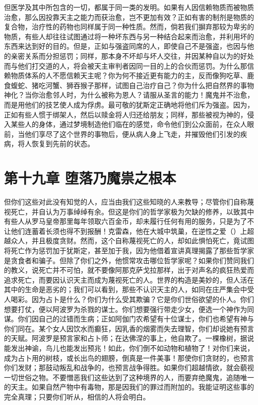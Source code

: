 但医学及其中所包含的一切，都属于同一类的发明。如果有人因信赖物质而被物质治愈，那么因投靠天主之能力而获治愈，岂不更加有效？正如有害的制剂是物质的复合物，治疗性的药物也同样属于同一种性质。然而，倘若我们摒弃那较为卑劣的物质，有些人却往往试图通过将一种坏东西与另一种结合起来而治愈，并利用坏的东西来达到好的目的。但是，正如与强盗同席的人，即使自己不是强盗，也因与他的亲密关系而分担惩罚；同样，那本身不坏却与坏人交往，并因某种自以为的好处而与他们打交道的人，将会被天主审判者因同一目的上的合伙而惩罚。为什么那信赖物质体系的人不愿信赖天主呢？你为何不接近更有能力的主，反而像狗吃草、鹿食蝮蛇、猪吃河蟹、狮吞猴子那样，试图自己治疗自己？你为什么把自然界的事物神化？当你治愈邻人时，为什么被称为恩人？请服从圣言的能力！魔鬼并不治愈，而是用他们的技艺使人成为俘虏。最可敬的犹斯定正确地将他们斥为强盗。因为，正如有些人惯于绑架人，然后以赎金将人归还给朋友；同样，那些被视为神的，侵入某些人的身体，通过梦境制造他们临在的感觉，命令他们到公众面前，在众人眼前，当他们享尽了这个世界的事物后，便从病人身上飞走，并摧毁他们引发的疾病，将人恢复到先前的状态。\par


\section{第十九章  堕落乃魔祟之根本}

但你们这些对此没有知觉的人，应当由我们这些知晓的人来教导；尽管你们自称蔑视死亡，并自认为万事绰绰有余。但这是你们的哲学家极为欠缺的修养，以致其中有些人从罗马皇帝那里每年领取六百金币，却未履行任何有用的服务，只是为了不让他们连蓄着长须也得不到报酬！克雷森，他在大城中筑巢，在逆性之爱（）上超越众人，并且极度贪财。然而，这个自称蔑视死亡的人，却如此惧怕死亡，竟试图将死亡作为惩罚加于犹斯定，甚至加于我，因为他借着宣讲真理揭露了那些哲学家是贪食者和骗子。但除了你们之外，他惯常攻击哪位哲学家呢？如果你们赞同我们的教义，说死亡并不可怕，就不要像阿那克萨戈拉那样，出于对声名的疯狂热爱而追求死亡，而要因认识天主而成为蔑视死亡的人。世界的构造是美妙的，但人活在其中的生命是恶劣的；我们可以看到，那些不认识天主的人，如同在庄严集会中受人喝彩。因为占卜是什么？你们为什么受其欺骗？它是你们世俗欲望的仆人。你们想要打仗，便以阿波罗为杀戮的谋士。你们想要强行带走少女，便选一个神作为同谋。你们因自己的过错而生病；正如阿伽门农希望有十位谋士，你们也希望有神与你们同在。某个女人因饮水而癫狂，因乳香的烟雾而失去理智，你们却说她有预言的天赋。阿波罗是预言家和占卜师；在达佛涅的事上，他自欺了。一棵橡树，据说能发出神谕，鸟儿也能发出预兆！如此，你们倒不如动物和植物了！对你们来说，成为占卜用的树枝，或长出鸟的翅膀，倒真是一件美事！那使你们贪财的，也预言你们发财；那鼓动叛乱和战争的，也预言战争得胜。如果你们超越情欲，就会藐视一切世俗之物。不要憎恶我们这些达到了这种境界的人，而要弃绝魔鬼，追随唯一的天主。如果自然产物中有毒物，那是因我们的罪过而附加的。我能证明这些事的完全真理；只要你们听从，相信的人将会明白。\par

